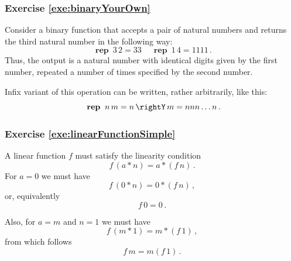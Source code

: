 \subsubsection*{Exercise \ref{exe:binaryYourOwn}}
Consider a binary function that accepts a pair of natural numbers and
returns the third natural number in the following way:
\[
\textbf{ rep }\, 3\,2 = 33\,\quad\textbf{ rep }\, 1\,4 = 1111\,.
\]
Thus, the output is a natural number with identical digits given by
the first number, repeated a number of times specified by the second
number.

Infix variant of this operation can be written, rather arbitrarily,
like this:
\[
\textbf{ rep }\, n\,m = n\,\rightY\,m = nnn\ldots n\,.
\]

\subsubsection*{Exercise \ref{exe:linearFunctionSimple}}
A linear function $f$ must satisfy the linearity condition
\[
f\,(a*n)=a*(f\, n)\,.
\]
For $a=0$ we must have
\[
f\,(0*n)=0*(f\, n)\,,
\]
or, equivalently
\[
f\,0= 0\,.
\]

Also, for $a=m$ and $n=1$ we must have
\[
f\,(m*1)= m*(f\, 1)\,,
\]
from which follows
\[
f\,m= m(f\, 1)\,.
\]

